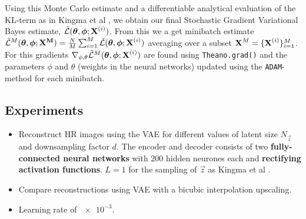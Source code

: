Using this Monte Carlo estimate and a differentiable analytical evaluation of the KL-term as in Kingma et al \cite{Kingma2013}, we obtain our final Stochastic Gradient Variational Bayes estimate, $\tilde{\mathcal{L}}(\bm{\mathrm{\theta}},\bm{\mathrm{\phi}};\bm{\mathrm{X}}^{(i)})$. From this we a get minibatch estimate $\tilde{\mathcal{L}}^M(\bm{\mathrm{\theta}},\bm{\mathrm{\phi}};\bm{\mathrm{X^M}}) = \frac{N}{M}\sum^{M}_{i=1}\tilde{\mathcal{L}}(\bm{\mathrm{\theta}},\bm{\mathrm{\phi}};\bm{\mathrm{X}}^{(i)})$ averaging over a subset $\bm{\mathrm{X}}^M = \{\bm{\mathrm{X}}^{(i)}\}^M_{i=1}$. 
For this gradients $\nabla_{\phi,\theta} \tilde{\mathcal{L}}^M(\bm{\mathrm{\theta}},\bm{\mathrm{\phi}};\bm{\mathrm{X}}^{(i)})$ are found using \texttt{Theano.grad()} and the parameters $\phi$ and $\theta$ (weights in the neural networks) updated using the \texttt{ADAM}-method \cite{Kingma2014b} for each minibatch. 



\subsection{Experiments}
\label{sub:experiments}

\begin{itemize}
	\item Reconstruct HR images using the VAE for different values of latent size $N_{\vec{z}}$ and downsampling factor $d$. The encoder and decoder consists of two \textbf{fully-connected neural networks} with $200$ hidden neurones each and \textbf{rectifying activation functions}. $L = 1$ for the sampling of $\vec{z}$ as Kingma et al \cite{Kingma2013}.
	\item Compare reconstructions using VAE with a bicubic interpolation upscaling.
	\item Learning rate of $\num{e-3}$.
\end{itemize}
